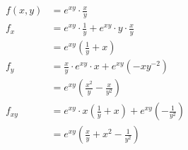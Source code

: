 \begin{align*}
	f(x, y) & = e^{x y} \cdot \frac{x}{y}                                                               \\
	f_x     & = e^{x y} \cdot \frac{1}{y} + e^{x y} \cdot y \cdot \frac{x}{y}                           \\
	        & = e^{x y} \left( \frac{1}{y} + x \right)                                                  \\
	f_y     & = \frac{x}{y} \cdot e^{x y} \cdot x + e^{x y} \left(-x y^{-2} \right)                     \\
	        & = e^{x y} \left( \frac{x^2}{y} - \frac{x}{y^2} \right)                                    \\
	f_{xy}  & = e^{x y} \cdot x \left( \frac{1}{y} + x \right) + e^{x y} \left( - \frac{1}{y^2} \right) \\
	        & = e^{x y} \left( \frac{x}{y} + x^2 - \frac{1}{y^2} \right)
\end{align*}
